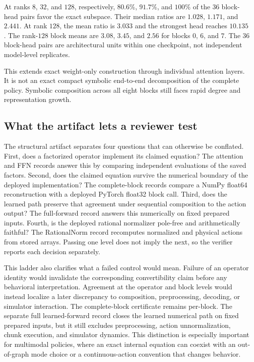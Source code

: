 \documentclass{article}
\begin{document}
At ranks $8$, $32$, and $128$, respectively, $80.6\%$, $91.7\%$, and $100\%$ of the $36$
block-head pairs favor the exact subspace. Their median ratios are $1.028$, $1.171$, and
$2.441$. At rank $128$, the mean ratio is $3.033$ and the strongest head reaches $10.135$.
The rank-$128$ block means are $3.08$, $3.45$, and $2.56$ for blocks $0$, $6$, and $7$.
The $36$ block-head pairs are architectural units within one checkpoint, not independent
model-level replicates.

This extends exact weight-only construction through individual attention layers. It is not an
exact compact symbolic end-to-end decomposition of the complete policy. Symbolic composition across all eight blocks
still faces rapid degree and representation growth.

\subsection{What the artifact lets a reviewer test}

The structural artifact separates four questions that can otherwise be conflated. First, does a
factorized operator implement its claimed equation? The attention and FFN records answer this by
comparing independent evaluations of the saved factors. Second, does the claimed equation survive
the numerical boundary of the deployed implementation? The complete-block records compare a
NumPy float64 reconstruction with a deployed PyTorch float32 block call. Third, does the learned
path preserve that agreement under sequential composition to the action output? The full-forward
record answers this numerically on fixed prepared inputs. Fourth, is the deployed rational
normalizer pole-free and arithmetically faithful? The RationalNorm record recomputes normalized and
physical actions from stored arrays. Passing one level does not imply the next, so the verifier
reports each decision separately.

This ladder also clarifies what a failed control would mean. Failure of an operator identity would
invalidate the corresponding convertibility claim before any behavioral interpretation. Agreement
at the operator and block levels would instead localize a later discrepancy to composition,
preprocessing, decoding, or simulator interaction. The complete-block certificate remains
per-block. The separate full learned-forward record closes the learned numerical path on fixed
prepared inputs, but it still excludes preprocessing, action unnormalization, chunk execution, and
simulator dynamics. This distinction is especially important for multimodal policies, where an
exact internal equation can coexist with an out-of-graph mode choice or a continuous-action
convention that changes behavior.
\end{document}
